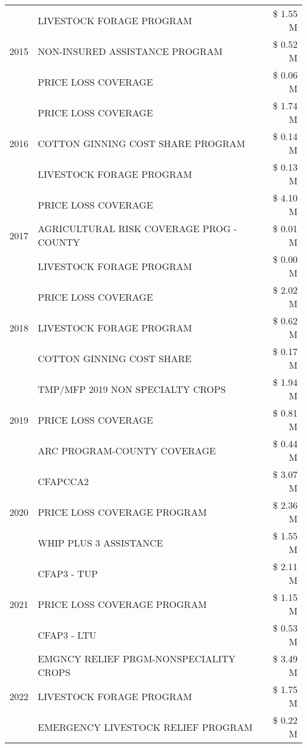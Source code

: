 \begin{tabular}{llr}
\cline{1-3}
\multirow[t]{3}{*}{2015} & LIVESTOCK FORAGE PROGRAM & \$ 1.55 M \\
 & NON-INSURED ASSISTANCE PROGRAM & \$ 0.52 M \\
 & PRICE LOSS COVERAGE & \$ 0.06 M \\
\cline{1-3}
\multirow[t]{3}{*}{2016} & PRICE LOSS COVERAGE & \$ 1.74 M \\
 & COTTON GINNING COST SHARE PROGRAM & \$ 0.14 M \\
 & LIVESTOCK FORAGE PROGRAM & \$ 0.13 M \\
\cline{1-3}
\multirow[t]{3}{*}{2017} & PRICE LOSS COVERAGE & \$ 4.10 M \\
 & AGRICULTURAL RISK COVERAGE PROG - COUNTY & \$ 0.01 M \\
 & LIVESTOCK FORAGE PROGRAM & \$ 0.00 M \\
\cline{1-3}
\multirow[t]{3}{*}{2018} & PRICE LOSS COVERAGE & \$ 2.02 M \\
 & LIVESTOCK FORAGE PROGRAM & \$ 0.62 M \\
 & COTTON GINNING COST SHARE & \$ 0.17 M \\
\cline{1-3}
\multirow[t]{3}{*}{2019} & TMP/MFP 2019 NON SPECIALTY CROPS & \$ 1.94 M \\
 & PRICE LOSS COVERAGE & \$ 0.81 M \\
 & ARC PROGRAM-COUNTY COVERAGE & \$ 0.44 M \\
\cline{1-3}
\multirow[t]{3}{*}{2020} & CFAPCCA2 & \$ 3.07 M \\
 & PRICE LOSS COVERAGE PROGRAM & \$ 2.36 M \\
 & WHIP PLUS 3 ASSISTANCE & \$ 1.55 M \\
\cline{1-3}
\multirow[t]{3}{*}{2021} & CFAP3 - TUP & \$ 2.11 M \\
 & PRICE LOSS COVERAGE PROGRAM & \$ 1.15 M \\
 & CFAP3 - LTU & \$ 0.53 M \\
\cline{1-3}
\multirow[t]{3}{*}{2022} & EMGNCY RELIEF PRGM-NONSPECIALITY CROPS & \$ 3.49 M \\
 & LIVESTOCK FORAGE PROGRAM & \$ 1.75 M \\
 & EMERGENCY LIVESTOCK RELIEF PROGRAM & \$ 0.22 M \\
\cline{1-3}
\bottomrule
\end{tabular}
